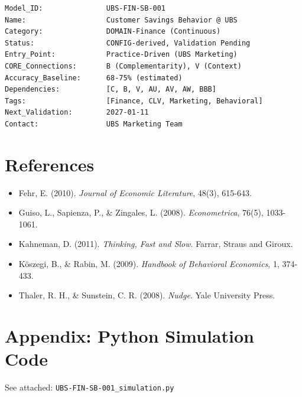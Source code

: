 \documentclass[11pt,a4paper]{article}
\begin{document}
\begin{verbatim}
Model_ID:               UBS-FIN-SB-001
Name:                   Customer Savings Behavior @ UBS
Category:               DOMAIN-Finance (Continuous)
Status:                 CONFIG-derived, Validation Pending
Entry_Point:            Practice-Driven (UBS Marketing)
CORE_Connections:       B (Complementarity), V (Context)
Accuracy_Baseline:      68-75% (estimated)
Dependencies:           [C, B, V, AU, AV, AW, BBB]
Tags:                   [Finance, CLV, Marketing, Behavioral]
Next_Validation:        2027-01-11
Contact:                UBS Marketing Team
\end{verbatim}

\section{References}

\begin{itemize}
\item Fehr, E. (2010). \textit{Journal of Economic Literature}, 48(3), 615-643.
\item Guiso, L., Sapienza, P., \& Zingales, L. (2008). \textit{Econometrica}, 76(5), 1033-1061.
\item Kahneman, D. (2011). \textit{Thinking, Fast and Slow}. Farrar, Straus and Giroux.
\item Köszegi, B., \& Rabin, M. (2009). \textit{Handbook of Behavioral Economics}, 1, 374-433.
\item Thaler, R. H., \& Sunstein, C. R. (2008). \textit{Nudge}. Yale University Press.
\end{itemize}

\section{Appendix: Python Simulation Code}

See attached: \texttt{UBS-FIN-SB-001\_simulation.py}
\end{document}
